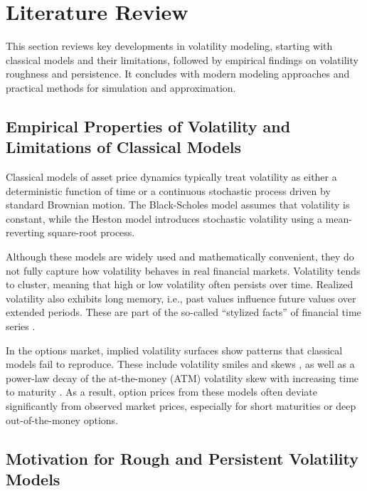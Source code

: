 \section{Literature Review} \label{sec:LiteratureReview}

This section reviews key developments in volatility modeling, starting with classical models and their limitations, followed by empirical findings on volatility roughness and persistence. It concludes with modern modeling approaches and practical methods for simulation and approximation.


\subsection{Empirical Properties of Volatility and Limitations of Classical Models} \label{subsec:EmpiricalVolatility}

Classical models of asset price dynamics typically treat volatility as either a deterministic function of time or a continuous stochastic process driven by standard Brownian motion. The Black-Scholes model \citep{BlackScholes1973} assumes that volatility is constant, while the Heston model \citep{Heston1993} introduces stochastic volatility using a mean-reverting square-root process.

Although these models are widely used and mathematically convenient, they do not fully capture how volatility behaves in real financial markets. Volatility tends to cluster, meaning that high or low volatility often persists over time. Realized volatility also exhibits long memory, i.e., past values influence future values over extended periods. These are part of the so-called “stylized facts” of financial time series \citep{Cont2001}.

In the options market, implied volatility surfaces show patterns that classical models fail to reproduce. These include volatility smiles and skews \citep{Rubinstein1985}, as well as a power-law decay of the at-the-money (ATM) volatility skew with increasing time to maturity \citep{GatheralJaissonRosenbaum2018}. As a result, option prices from these models often deviate significantly from observed market prices, especially for short maturities or deep out-of-the-money options.


\subsection{Motivation for Rough and Persistent Volatility Models} \label{subsec:MotivationRoughPersistent}

